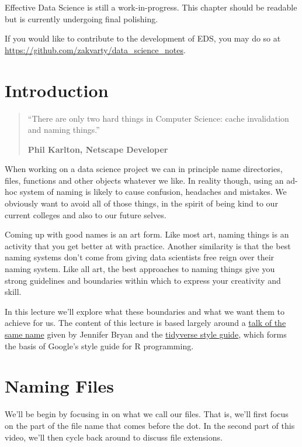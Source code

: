 \documentclass[
  12pt,
]{book}
\begin{document}
Effective Data Science is still a work-in-progress. This chapter should be readable but is currently undergoing final polishing.

If you would like to contribute to the development of EDS, you may do so at \url{https://github.com/zakvarty/data_science_notes}.

\hypertarget{introduction}{%
\section{Introduction}\label{introduction}}

\begin{quote}
``There are only two hard things in Computer Science: cache invalidation and naming things.''

\textbf{Phil Karlton, Netscape Developer}
\end{quote}

When working on a data science project we can in principle name directories, files, functions and other objects whatever we like. In reality though, using an ad-hoc system of naming is likely to cause confusion, headaches and mistakes. We obviously want to avoid all of those things, in the spirit of being kind to our current colleges and also to our future selves.

Coming up with good names is an art form. Like most art, naming things is an activity that you get better at with practice. Another similarity is that the best naming systems don't come from giving data scientists free reign over their naming system. Like all art, the best approaches to naming things give you strong guidelines and boundaries within which to express your creativity and skill.

In this lecture we'll explore what these boundaries and what we want them to achieve for us. The content of this lecture is based largely around a \href{https://speakerdeck.com/jennybc/how-to-name-files}{talk of the same name} given by Jennifer Bryan and the \href{https://style.tidyverse.org/}{tidyverse style guide}, which forms the basis of Google's style guide for R programming.

\hypertarget{naming-files}{%
\section{Naming Files}\label{naming-files}}

We'll be begin by focusing in on what we call our files. That is, we'll first focus on the part of the file name that comes before the dot. In the second part of this video, we'll then cycle back around to discuss file extensions.
\end{document}
